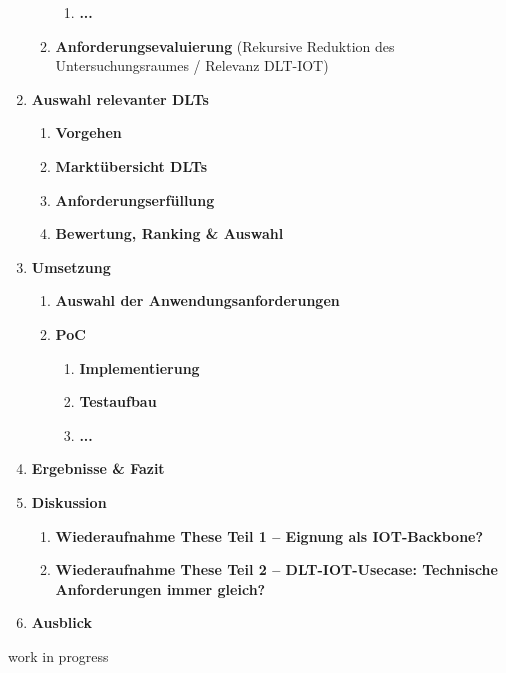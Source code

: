 \documentclass[
    ngerman,american
    ]{scrartcl}
\newcommand{\lang}{de}
\begin{document}
\begin{enumerate}
\begin{enumerate}
\begin{enumerate}
	      	      	\item \textbf{...}
	      	      \end{enumerate}
	      	\item \textbf{Anforderungsevaluierung} (Rekursive Reduktion des Untersuchungsraumes / Relevanz DLT-IOT)
	      \end{enumerate}
	\item \textbf{Auswahl relevanter DLTs}
	      \begin{enumerate}
	      	\item \textbf{Vorgehen}
	      	\item \textbf{Marktübersicht DLTs}
	      	\item \textbf{Anforderungserfüllung}
	      	\item \textbf{Bewertung, Ranking \& Auswahl}
	      \end{enumerate}
	\item \textbf{Umsetzung}
	      \begin{enumerate}
	      	\item \textbf{Auswahl der Anwendungsanforderungen}
	      	\item \textbf{PoC}
	      	      \begin{enumerate}
	      	      	\item \textbf{Implementierung}
	      	      	\item \textbf{Testaufbau}
	      	      	\item \textbf{...}
	      	      \end{enumerate}
	      \end{enumerate}
	\item \textbf{Ergebnisse \& Fazit}
  \item \textbf{Diskussion}
	      \begin{enumerate}
	      	\item \textbf{Wiederaufnahme These Teil 1 – Eignung als IOT-Backbone?}
	      	\item \textbf{Wiederaufnahme These Teil 2 – DLT-IOT-Usecase: Technische Anforderungen immer gleich?}
	      \end{enumerate}
	\item \textbf{Ausblick}
\end{enumerate}

\newpage

\sectionSource{\lang}
\sectionSourceDescription{\lang}

%
%
\begin{description}
	\item[work in progress]
\end{description}

\newpage

\printbibliography
\end{document}
